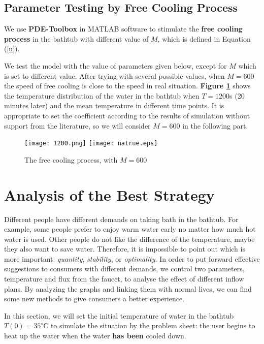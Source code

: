 \documentclass{HZNUMCM}
\begin{document}
\subsection{Parameter Testing by Free Cooling Process}
We use \textbf{PDE-Toolbox} in MATLAB software to stimulate the \textbf{free cooling process} in the
bathtub with different value of $M$, which is defined in Equation (\ref{u}).

We test the model with the value of parameters given below, except for $M$ which is set to different
value. After trying with several possible values, when $M=600$ the speed of free cooling is close to
the speed in real situation. \textbf{Figure \ref{nt}} shows the temperature distribution of the
water in the bathtub when $T=1200$s (20 minutes later) and the mean temperature in different time
points. It is appropriate to set the coefficient according to the results of simulation without
support from the literature, so we will consider $M=600$ in the following part.

\begin{figure}[!htbp]
\small
\centering
\texttt{[image: 1200.png]}
\texttt{[image: natrue.eps]}
\caption{The free cooling process, with $M=600$}\label{nt}
\end{figure}

\section{Analysis of the Best Strategy}
Different people have different demands on taking bath in the bathtub. For example, some people
prefer to enjoy warm water early no matter how much hot water is used. Other people do not like the
difference of the temperature, maybe they also want to save water. Therefore, it is impossible to
point out which is more important: \emph{quantity}, \emph{stability}, or \emph{optimality}. In order
to put forward effective suggestions to consumers with different demands, we control two parameters,
temperature and flux from the faucet, to analyse the effect of different inflow plans. By analyzing
the graphs and linking them with normal lives, we can find some new methods to give consumers a
better experience.

In this section, we will set the initial temperature of water in the bathtub $T(0)=35^\circ$C to
simulate the situation by the problem sheet: the user begins to heat up the water when the water
\textbf{has been} cooled down.
\end{document}
